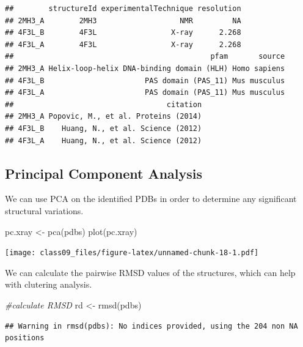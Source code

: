 \documentclass[
]{article}
\newenvironment{Shaded}{\begin{snugshade}}{\end{snugshade}}
\newcommand{\CommentTok}[1]{\textcolor[rgb]{0.56,0.35,0.01}{\textit{#1}}}
\newcommand{\FunctionTok}[1]{\textcolor[rgb]{0.00,0.00,0.00}{#1}}
\newcommand{\NormalTok}[1]{#1}
\newcommand{\OtherTok}[1]{\textcolor[rgb]{0.56,0.35,0.01}{#1}}
\begin{document}
\begin{verbatim}
##        structureId experimentalTechnique resolution
## 2MH3_A        2MH3                   NMR         NA
## 4F3L_B        4F3L                 X-ray      2.268
## 4F3L_A        4F3L                 X-ray      2.268
##                                             pfam       source
## 2MH3_A Helix-loop-helix DNA-binding domain (HLH) Homo sapiens
## 4F3L_B                       PAS domain (PAS_11) Mus musculus
## 4F3L_A                       PAS domain (PAS_11) Mus musculus
##                                   citation
## 2MH3_A Popovic, M., et al. Proteins (2014)
## 4F3L_B    Huang, N., et al. Science (2012)
## 4F3L_A    Huang, N., et al. Science (2012)
\end{verbatim}

\hypertarget{principal-component-analysis}{%
\subsection{Principal Component
Analysis}\label{principal-component-analysis}}

We can use PCA on the identified PDBs in order to determine any
significant structural variations.

\begin{Shaded}
\begin{Highlighting}[]
\NormalTok{pc.xray }\OtherTok{\textless{}{-}} \FunctionTok{pca}\NormalTok{(pdbs)}
\FunctionTok{plot}\NormalTok{(pc.xray)}
\end{Highlighting}
\end{Shaded}

\texttt{[image: class09\_files/figure-latex/unnamed-chunk-18-1.pdf]}

We can calculate the pairwise RMSD values of the structures, which can
help with clutering analysis.

\begin{Shaded}
\begin{Highlighting}[]
\CommentTok{\#calculate RMSD}
\NormalTok{rd }\OtherTok{\textless{}{-}} \FunctionTok{rmsd}\NormalTok{(pdbs)}
\end{Highlighting}
\end{Shaded}

\begin{verbatim}
## Warning in rmsd(pdbs): No indices provided, using the 204 non NA positions
\end{verbatim}
\end{document}
